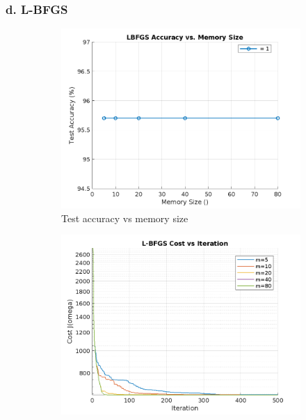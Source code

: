 \documentclass{article}
\begin{document}
\subsubsection{d. L-BFGS}

\begin{figure}[H]
  \centering
  \begin{subfigure}[b]{0.3\textwidth}
    \centering
    \includegraphics[width=\textwidth]{images/lbfgs_accuracy_vs_memory_size.png}
    \caption{Test accuracy vs memory size}
    \label{fig:step_size_acc_lbfgs}
  \end{subfigure}
  \begin{subfigure}[b]{0.3\textwidth}
    \centering
    \includegraphics[width=\textwidth]{images/lbfgs_cost_vs_iteration.png}

\end{subfigure}
\end{figure}
\end{document}
